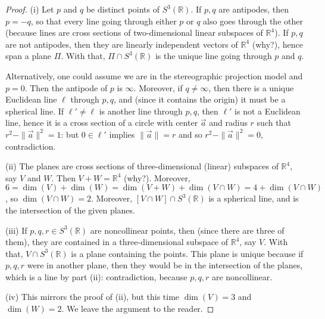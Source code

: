 \documentclass[leqno]{book}
\begin{document}
\begin{proof}
(i) Let $p$ and $q$ be distinct points of $S^3(\mathbb R)$.  If $p,q$ are antipodes, then $p=-q$, so that every line going through either $p$ or $q$ also goes through the other (because lines are cross sections of two-dimensional linear subspaces of $\mathbb R^4$).  If $p,q$ are not antipodes, then they are linearly independent vectors of $\mathbb R^4$ (why?), hence span a plane $\Pi$.  With that, $\Pi\cap S^3(\mathbb R)$ is the unique line going through $p$ and $q$.

Alternatively, one could assume we are in the stereographic projection model and $p=0$.  Then the antipode of $p$ is $\infty$.  Moreover, if $q\ne\infty$, then there is a unique Euclidean line $\ell$ through $p,q$, and (since it contains the origin) it must be a spherical line.  If $\ell'\ne\ell$ is another line through $p,q$, then $\ell'$ is not a Euclidean line, hence it is a cross section of a circle with center $\vec a$ and radius $r$ such that $r^2-\|\vec a\|^2=1$: but $0\in\ell'$ implies $\|\vec a\|=r$ and so $r^2-\|\vec a\|^2=0$, contradiction.

(ii) The planes are cross sections of three-dimensional (linear) subspaces of $\mathbb R^4$, say $V$ and $W$.  Then $V+W=\mathbb R^4$ (why?).  Moreover, $6=\dim(V)+\dim(W)=\dim(V+W)+\dim(V\cap W)=4+\dim(V\cap W)$, so $\dim(V\cap W)=2$.  Moreover, $[V\cap W]\cap S^3(\mathbb R)$ is a spherical line, and is the intersection of the given planes.

(iii) If $p,q,r\in S^3(\mathbb R)$ are noncollinear points, then (since there are three of them), they are contained in a three-dimensional subspace of $\mathbb R^4$, say $V$.  With that, $V\cap S^3(\mathbb R)$ is a plane containing the points.  This plane is unique because if $p,q,r$ were in another plane, then they would be in the intersection of the planes, which is a line by part (ii): contradiction, because $p,q,r$ are noncollinear.

(iv) This mirrors the proof of (ii), but this time $\dim(V)=3$ and $\dim(W)=2$.  We leave the argument to the reader.
\end{proof}
\end{document}
